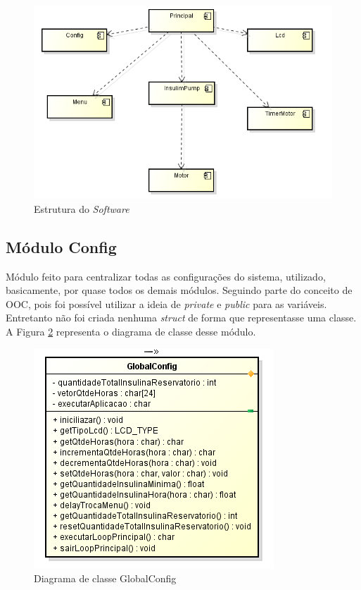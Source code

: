 \begin{figure}[htp]
	\centering
	\includegraphics[scale=0.7]{images/arquitetura.png}
	\caption{Estrutura do \emph{Software}}	
	\label{fig:arquiteturageral}
\end{figure}

\subsection{Módulo Config}

Módulo feito para centralizar todas as configurações do sistema, utilizado, basicamente, por quase todos os demais módulos. Seguindo parte do conceito de OOC, pois foi possível utilizar a ideia de \emph{private} e \emph{public} para as variáveis. Entretanto não foi criada nenhuma \emph{struct} de forma que representasse uma classe. A Figura \ref{fig:driagramaclasseconfig} representa o diagrama de classe desse módulo. \newpage


\begin{figure}[htp]
	\centering
	\includegraphics[scale=1]{images/classe_GlobalConfig.png}
	\caption{Diagrama de classe GlobalConfig}	
	\label{fig:driagramaclasseconfig}
\end{figure}

